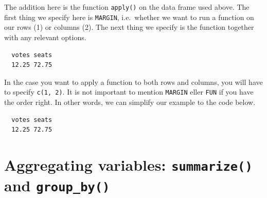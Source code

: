 \documentclass[12pt,oneside]{reedthesis}
\theoremstyle{definition}
\theoremstyle{definition}
\theoremstyle{definition}
\theoremstyle{remark}
\begin{document}
  The addition here is the function \texttt{apply()} on the data frame
  used above. The first thing we specify here is \texttt{MARGIN},
  i.e.~whether we want to run a function on our rows (1) or columns (2).
  The next thing we specify is the function together with any relevant
  options.
  \begin{Shaded}
  \end{Shaded}
  \begin{verbatim}
  votes seats 
  12.25 72.75 
  \end{verbatim}
  In the case you want to apply a function to both rows and columns, you
  will have to specify \texttt{c(1,\ 2)}. It is not important to mention
  \texttt{MARGIN} eller \texttt{FUN} if you have the order right. In other
  words, we can simplify our example to the code below.
  \begin{Shaded}
  \end{Shaded}
  \begin{verbatim}
  votes seats 
  12.25 72.75 
  \end{verbatim}
  \section{\texorpdfstring{Aggregating variables: \texttt{summarize()} and
  \texttt{group\_by()}}{Aggregating variables: summarize() and group\_by()}}\label{aggregating-variables-summarize-and-group_by}
  
\end{document}
